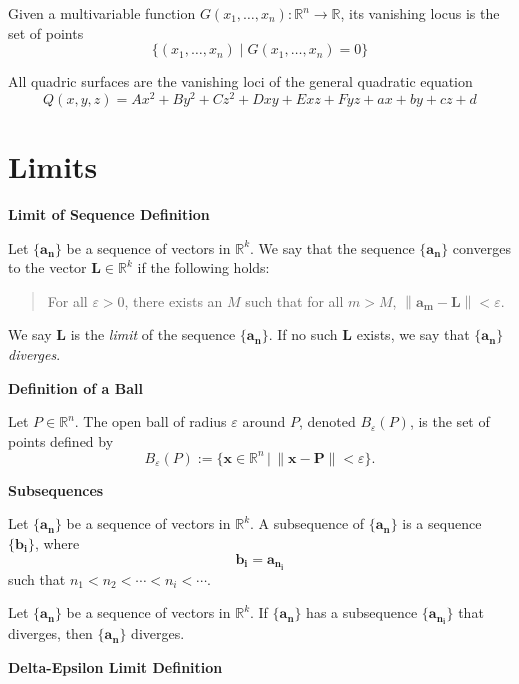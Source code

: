 \documentclass{article}
\newcommand{\R}{\mathbb{R}}
\begin{document}
Given a multivariable function \( G(x_1, \dots, x_n) : \mathbb{R}^n \rightarrow \mathbb{R} \), its vanishing
locus is the set of points
\[ \{ (x_1, \dots, x_n) \mid G(x_1, \dots, x_n) = 0 \} \]

All quadric surfaces are the vanishing loci of the general quadratic equation
\[ Q(x, y, z) = Ax^2 + By^2 + Cz^2 + Dxy + Exz + Fyz + ax + by + cz + d \]



\section*{Limits}

\noindent \textbf{Limit of Sequence Definition}

Let $\{\bm{a_n}\}$ be a sequence of vectors in $\mathbb{R}^k$. We say that the sequence $\{\bm{a_n}\}$ converges to the vector $\bm{L} \in \mathbb{R}^k$ if the following holds:

\begin{quote}
    For all $\varepsilon > 0$, there exists an $M$ such that for all $m > M$, $\left\|\bm{a_m} - \bm{L}\right\| < \varepsilon$.
\end{quote}

We say $\bm{L}$ is the \textit{limit} of the sequence $\{\bm{a_n}\}$. If no such $\bm{L}$ exists, we say that $\{\bm{a_n}\}$ \textit{diverges}.

\vspace{0.5cm}

\noindent \textbf{Definition of a Ball}

Let $P \in \R^n$. The open ball of radius $\varepsilon$ around $P$, denoted $B_{\varepsilon}(P)$, is the set of points defined by
\[ B_{\varepsilon}(P) := \{ \bm{x} \in \R^n \,|\, \|\bm{x} - \bm{P}\| < \varepsilon \}. \]

\vspace{0.5cm}

\noindent \textbf{Subsequences}

Let $\{\bm{a_n}\}$ be a sequence of vectors in $\R^k$. A subsequence of $\{\bm{a_n}\}$ is a sequence $\{\bm{b_i}\}$, where
\[\bm{b_i} = \bm{a_{n_i}}\]
such that $n_1 < n_2 < \cdots < n_i < \cdots$.

Let $\{\bm{a_n}\}$ be a sequence of vectors in $\R^k$. If $\{\bm{a_n}\}$ has a subsequence $\{\bm{a_{n_i}}\}$ that diverges, then $\{\bm{a_n}\}$ diverges.

\vspace{0.5cm}

\noindent \textbf{Delta-Epsilon Limit Definition}
\end{document}
